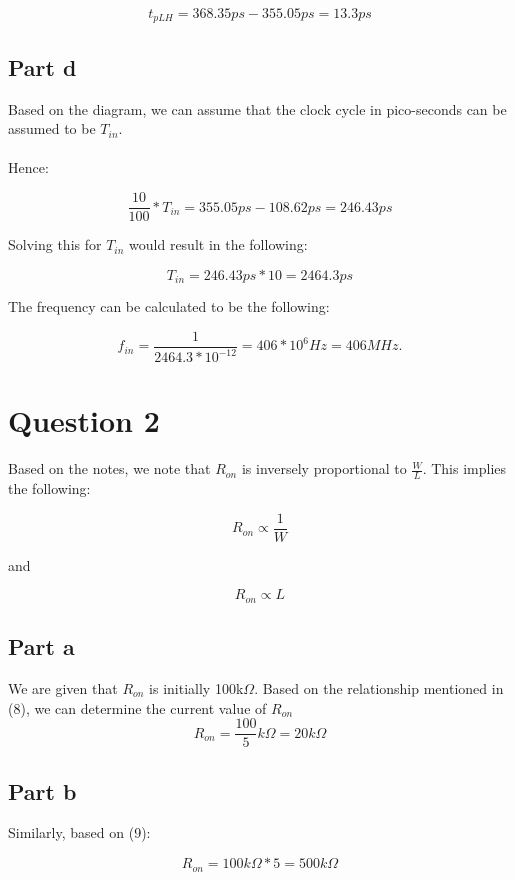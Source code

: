 \documentclass{article}
\begin{document}
\begin{equation}
    t_{pLH} = 368.35ps - 355.05ps = 13.3ps
\end{equation}

\subsection*{Part d}
Based on the diagram, we can assume that the clock cycle in pico-seconds can be assumed to be $T_{in}$.
\\\\Hence:

\begin{equation}
    \frac{10}{100} * T_{in} = 355.05ps - 108.62ps = 246.43 ps
\end{equation}

Solving this for $T_{in}$ would result in the following:

\begin{equation}
    T_{in} = 246.43 ps * 10 = 2464.3ps
\end{equation}

The frequency can be calculated to be the following:

\begin{equation}
    f_{in} = \frac{1}{2464.3 * 10^{-12}} = 406 * 10^{6} Hz = 406MHz.
\end{equation}


\section*{Question 2}
Based on the notes, we note that $R_{on}$ is inversely proportional to $\frac{W}{L}$. This implies the following:

\begin{equation}
    R_{on} \propto \frac{1}{W}
\end{equation}

and

\begin{equation}
    R_{on} \propto L
\end{equation}

\subsection*{Part a}
We are given that $R_{on}$ is initially 100k$\Omega$. Based on the relationship mentioned in (8), we can determine the current value of $R_{on}$
\begin{equation}
    R_{on} = \frac{100}{5}k\Omega = 20k\Omega
\end{equation}

\subsection*{Part b}
Similarly, based on (9):

\begin{equation}
    R_{on} = 100k\Omega * 5 = 500k\Omega
\end{equation}
\end{document}
